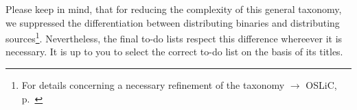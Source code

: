 \begin{footnotesize}
{{{{{          
          }
      }
    }
  }
}
\end{footnotesize}
\label{OSLiCUseCaseFinder}

Please keep in mind, that for reducing the complexity of this general taxonomy,
we suppressed the differentiation between distributing binaries and distributing
sources\footnote{For details concerning a necessary refinement of the taxonomy
$\rightarrow$ OSLiC, p.\ \pageref{sec:SourceBinaryDifference}}. Nevertheless,
the final to-do lists respect this difference whereever it is necessary. It is
up to you to select the correct to-do list on the basis of its titles.

